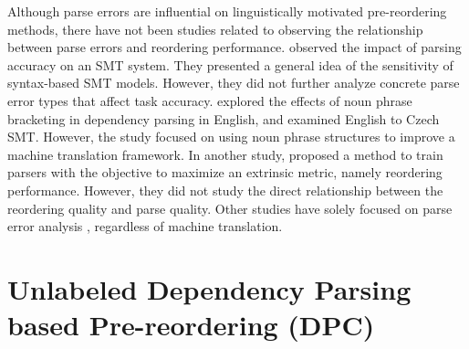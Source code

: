 \documentclass[english]{jnlp_1.4}
\begin{document}
Although parse errors are influential on linguistically motivated pre-reordering 
methods, there have not been studies related to observing the relationship between 
parse errors and reordering performance.  observed the impact 
of parsing accuracy on an SMT system. They presented a general idea of the sensitivity 
of syntax-based SMT models. However, they did not further analyze concrete parse 
error types that affect task accuracy.  explored the effects 
of noun phrase bracketing in dependency parsing in English, and examined English 
to Czech SMT. However, the study focused on using noun phrase structures to improve 
a machine translation framework. In another study,  proposed 
a method to train parsers with the objective to maximize an extrinsic metric, namely reordering performance.
However, they did not study the direct relationship between the reordering quality and
parse quality. Other studies have solely focused on parse error analysis \cite{RM2007,MD2007,TH2009,KY2011},
regardless of machine translation.


\section{Unlabeled Dependency Parsing based Pre-reordering (DPC)}
\label{sec:met}
\end{document}
